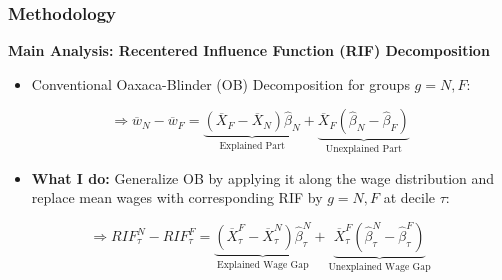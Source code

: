 \documentclass[10pt]{beamer}
\begin{document}
	


\begin{frame} 
	\frametitle{Methodology}
	
	\textbf{Main Analysis: Recentered Influence Function (RIF) Decomposition}
	
	
	\begin{itemize}
		\item Conventional Oaxaca-Blinder (OB) Decomposition for groups $g=N, F$:   
	\end{itemize}
	
	\begin{equation} \label{ob_decomp}
	\Longrightarrow	\overline{w}_N - \overline{w}_F =  \underbrace{(\overline{X}_F - \overline{X}_N) \hat{\beta}_N}_\text{Explained Part} + \underbrace{\overline{X}_F(\hat{\beta}_N - \hat{\beta}_F)}_\text{Unexplained Part}
	\end{equation} 
	
	\bigskip
	
	\begin{itemize}
		\item \textbf{What I do:} Generalize OB by applying it along the wage distribution and replace mean wages with corresponding RIF by $g=N, F$ at decile $\tau$:
	\end{itemize}
	
	\begin{equation} \label{rif_decomp}
	\Longrightarrow 	RIF_{\tau}^{N} - RIF_{\tau}^{F} =  \underbrace{(\overline{X}_{\tau}^{F} - \overline{X}_{\tau}^{N}) \hat{\beta}_{\tau}^{N}}_\text{Explained Wage Gap} + \underbrace{\overline{X}_{\tau}^{F}(\hat{\beta}_{\tau}^{N} - \hat{\beta}_{\tau}^{F})}_\text{Unexplained Wage Gap}
	\end{equation} 
	
	
	
	
\end{frame}

\end{document}

